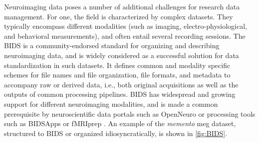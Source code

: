 Neuroimaging data poses a number of additional challenges for research data management.
For one, the field is characterized by complex datasets.
They typically encompass different modalities (such as imaging, electro-physiological, and behavioral measurements), and often entail several recording sessions.
The \gls{BIDS} \citep{gorgolewski2016brain} is a community-endorsed standard for organizing and describing neuroimaging data, and is widely considered as a successful solution for data standardization in such datasets.
It defines common and modality specific schemes for file names and file organization, file formats, and metadata to accompany raw  or derived data, i.e., both original acquisitions as well as the outputs of common processing pipelines.
\gls{BIDS} has widespread and growing support for different neuroimaging modalities, and is made a common prerequisite by neuroscientific data portals such as OpenNeuro \citep{markiewicz2021openneuro} or processing tools such as BIDSApps \citep{gorgolewski2017bids} or fMRIprep \citep{esteban2019fmriprep}.
An example of the \textit{memento} \gls{meg} dataset, structured to \gls{BIDS} or organized idiosyncratically, is shown in \cref{fig:BIDS}. \\
